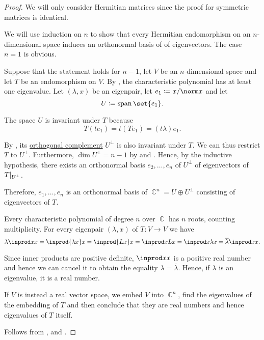 \begin{proof}
  We will only consider Hermitian matrices since the proof for symmetric matrices is identical.

   We will use induction on \( n \) to show that every Hermitian endomorphism on an \( n \)-dimensional space induces an orthonormal basis of of eigenvectors. The case \( n = 1 \) is obvious.

  Suppose that the statement holds for \( n - 1 \), let \( V \) be an \( n \)-dimensional space and let \( T \) be an endomorphism on \( V \). By , the characteristic polynomial has at least one eigenvalue. Let \( (\lambda, x) \) be an eigenpair, let \( e_1 \coloneqq \ifrac x {\norm x} \) and let
  \begin{equation*}
    U \coloneqq \linspan\set{ e_1 }.
  \end{equation*}

  The space \( U \) is invariant under \( T \) because
  \begin{equation*}
    T(t e_1) = t(T e_1) = (t\lambda) e_1.
  \end{equation*}

  By , its \hyperref[def:orthogonality]{orthogonal complement} \( U^\perp \) is also invariant under \( T \). We can thus restrict \( T \) to \( U^\perp \). Furthermore, \( \dim U^\perp = n - 1 \) by  and . Hence, by the inductive hypothesis, there exists an orthonormal basis \( e_2, \ldots, e_n \) of \( U^\perp \) of eigenvectors of \( T\vert_{U^\perp} \).

  Therefore, \( e_1, \ldots, e_n \) is an orthonormal basis of \( \BbbC^n = U \oplus U^\perp \) consisting of eigenvectors of \( T \).

   Every characteristic polynomial of degree \( n \) over \( \BbbC \) has \( n \) roots, counting multiplicity. For every eigenpair \( (\lambda, x) \) of \( T: V \to V \) we have
  \begin{equation*}
    \lambda \inprod x x
    =
    \inprod {\lambda x} x
    =
    \inprod {L x} x
    =
    \inprod x {L x}
    =
    \inprod x {\lambda x}
    =
    \overline \lambda \inprod x x.
  \end{equation*}

  Since inner products are positive definite, \( \inprod x x \) is a positive real number and hence we can cancel it to obtain the equality \( \lambda = \overline \lambda \). Hence, if \( \lambda \) is an eigenvalue, it is a real number.

   If \( V \) is instead a real vector space, we embed \( V \) into \( \BbbC^n \), find the eigenvalues of the embedding of \( T \) and then conclude that they are real numbers and hence eigenvalues of \( T \) itself.

   Follows from ,  and .
\end{proof}
